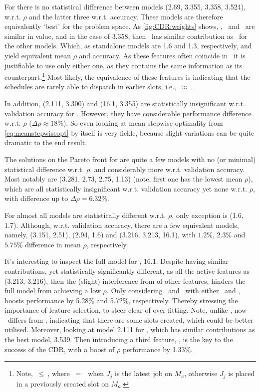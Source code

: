 For   there is no statistical difference between models (2.69, 
3.355, 3.358, 3.524), w.r.t. $\rho$ and the latter three w.r.t. 
accuracy. These models are therefore equivalently `best' for the problem space.
As \cref{fig:CDR:weights} shows, \phiendTime, \phijobWrm\ and \phimacWrm\ are 
similar in value, and in the case of 3.358, then \phimacFree\ has similar 
contribution as \phiendTime\ for the other models. 
Which, as standalone models are 1.6 and 1.3, respectively, and yield 
equivalent mean $\rho$ and accuracy.
As these features often coincide in \jsp\, it is justifiable to use only 
either one, as they contains the same information as its 
counterpart.\footnote{Note, \phiendTime$~\leq~$\phimacFree, where
  \phiendTime$~=~$\phimacFree\ when $J_j$ is the latest job on $M_a$, 
  otherwise $J_j$ is placed in a previously created slot on $M_a$.}
Most likely, the equivalence of these features is indicating that the 
schedules are rarely able to dispatch in earlier slots, i.e., 
\phiendTime$~\approx~$\phimacFree. 

In addition, (2.111, 3.300) and (16.1, 3.355) are statistically insignificant 
w.r.t. validation accuracy for . However, they have considerable 
performance difference w.r.t. $\rho$ ($\Delta\rho \approx 18\%$). 
So even looking at mean stepwise optimality from \cref{eq:meanstepwiseopt} by 
itself is very fickle, because slight variations can be quite dramatic to the 
end result. 

The solutions on the Pareto front for  are quite a few models
with no (or minimal) statistical difference w.r.t. $\rho$, and 
considerably more w.r.t. validation accuracy. 
Most notably are (3.281, 2.73, 2.75, 1.13)
(note, first one has the lowest mean $\rho$), which are all statistically 
insignificant w.r.t. validation accuracy yet none w.r.t. $\rho$, with 
difference up to $\Delta\rho=6.32\%$.

For  almost all models are statistically different w.r.t. $\rho$, 
only exception is (1.6, 1.7).
Although, w.r.t. validation accuracy, there are a few equivalent models, 
namely, (3.151, 2.51), (2.94, 1.6) and (3.216, 3.213, 16.1), with $1.2\%$, 
$2.3\%$ and $5.75\%$ difference in mean $\rho$, respectively. 

It's interesting to inspect the full model for , 16.1. 
Despite having similar contributions, yet statistically significantly 
different, as all the active features as (3.213, 3.216), then the (slight) 
interference from of other features, hinders the full model from achieving a 
low $\rho$. 
Only considering \phijobOps\ and \phimacOps\ with either \phiendTime\ and 
\phimacFree, boosts performance by 5.28\% and 5.72\%, respectively. 
Thereby stressing the importance of feature selection, to steer clear of 
over-fitting. Note, unlike , now \phiendTime\ differs from 
\phimacFree, indicating that there are some slots created, which could be 
better utilised.
Moreover, looking at model 2.111 for , which has similar 
contributions as the best model, 3.539. Then introducing a third feature, 
\phimacWrm, is the key to the success of the CDR, with a boost of $\rho$ 
performance by 1.33\%. 

